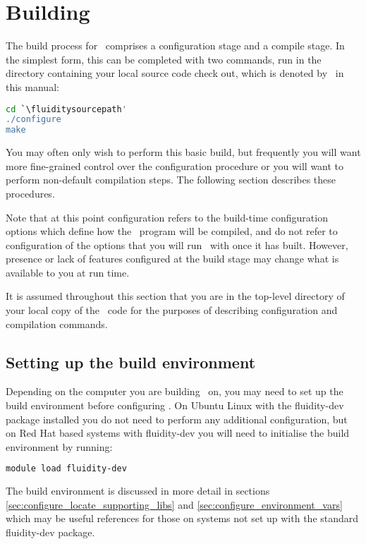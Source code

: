 \section{Building \fluidity}
\label{sec:building_fluidity}

The build process for \fluidity\ comprises a configuration stage and a compile
stage. In the simplest form, this can be completed with two commands, run in
the directory containing your local source code check out, which is denoted
by \fluiditysourcepath\ in this manual:

\begin{lstlisting}[language=Bash]
cd `\fluiditysourcepath' 
./configure
make
\end{lstlisting}

You may often only wish to perform this basic build, but frequently you will
want more fine-grained control over the configuration procedure or you will
want to perform non-default compilation steps. The following section describes
these procedures.

Note that at this point configuration refers to the build-time configuration
options which define how the \fluidity\ program will be compiled, and do not
refer to configuration of the options that you will run \fluidity\ with once it 
has built. However, presence or lack of features configured at the build stage
may change what is available to you at run time.

It is assumed throughout this section that you are in the top-level directory
of your local copy of the \fluidity\ code for the purposes of describing
configuration and compilation commands.

\subsection{Setting up the build environment}

Depending on the computer you are building \fluidity\ on, you may need to set
up the build environment before configuring \fluidity. On Ubuntu Linux with the
fluidity-dev package installed you do not need to perform any additional
configuration, but on Red Hat based systems with fluidity-dev you will need to
initialise the build environment by running:

\begin{lstlisting}[language=Bash]
module load fluidity-dev
\end{lstlisting}

The build environment is discussed in more detail in sections
\ref{sec:configure_locate_supporting_libs} and
\ref{sec:configure_environment_vars} which may be useful references for those
on systems not set up with the standard fluidity-dev package.

